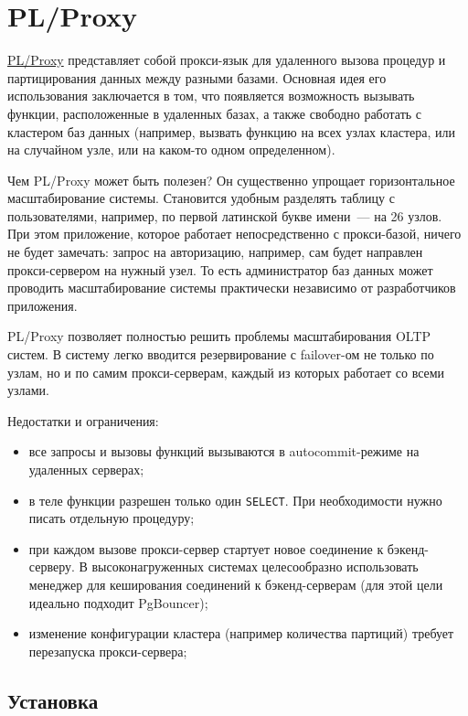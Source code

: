 \section{PL/Proxy}
\label{sec:plproxy}

\href{https://plproxy.github.io/}{PL/Proxy} представляет собой прокси-язык для удаленного вызова процедур и партицирования данных между разными базами. Основная идея его использования заключается в том, что появляется возможность вызывать функции, расположенные в удаленных базах, а также свободно работать с кластером баз данных (например, вызвать функцию на всех узлах кластера, или на случайном узле, или на каком-то одном определенном).

Чем PL/Proxy может быть полезен? Он существенно упрощает горизонтальное масштабирование системы. Становится удобным разделять таблицу с пользователями, например, по первой латинской букве имени~--- на 26 узлов. При этом приложение, которое работает непосредственно с прокси-базой, ничего не будет замечать: запрос на авторизацию, например, сам будет направлен прокси-сервером на нужный узел. То есть администратор баз данных может проводить масштабирование системы практически независимо от разработчиков приложения.

PL/Proxy позволяет полностью решить проблемы масштабирования OLTP систем. В систему легко вводится резервирование с failover-ом не только по узлам, но и по самим прокси-серверам, каждый из которых работает со всеми узлами.

Недостатки и ограничения:

\begin{itemize}
  \item все запросы и вызовы функций вызываются в autocommit-режиме на удаленных серверах;
  \item в теле функции разрешен только один \lstinline!SELECT!. При необходимости нужно писать отдельную процедуру;
  \item при каждом вызове прокси-сервер стартует новое соединение к бэкенд-серверу. В высоконагруженных системах целесообразно использовать менеджер для кеширования соединений к бэкенд-серверам (для этой цели идеально подходит PgBouncer);
  \item изменение конфигурации кластера (например количества партиций) требует перезапуска прокси-сервера;
\end{itemize}


\subsection{Установка}


